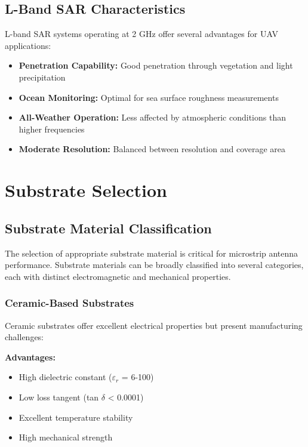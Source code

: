 \documentclass[12pt]{article}
\begin{document}
\subsection{L-Band SAR Characteristics}

L-band SAR systems operating at 2 GHz offer several advantages for UAV applications:

\begin{itemize}
    \item \textbf{Penetration Capability:} Good penetration through vegetation and light precipitation
    \item \textbf{Ocean Monitoring:} Optimal for sea surface roughness measurements
    \item \textbf{All-Weather Operation:} Less affected by atmospheric conditions than higher frequencies
    \item \textbf{Moderate Resolution:} Balanced between resolution and coverage area
\end{itemize}

\section{Substrate Selection}

\subsection{Substrate Material Classification}

The selection of appropriate substrate material is critical for microstrip antenna performance. Substrate materials can be broadly classified into several categories, each with distinct electromagnetic and mechanical properties.

\subsubsection{Ceramic-Based Substrates}

Ceramic substrates offer excellent electrical properties but present manufacturing challenges:

\textbf{Advantages:}
\begin{itemize}
    \item High dielectric constant ($\varepsilon_r$ = 6-100)
    \item Low loss tangent (tan $\delta$ < 0.0001)
    \item Excellent temperature stability
    \item High mechanical strength
\end{itemize}
\end{document}
